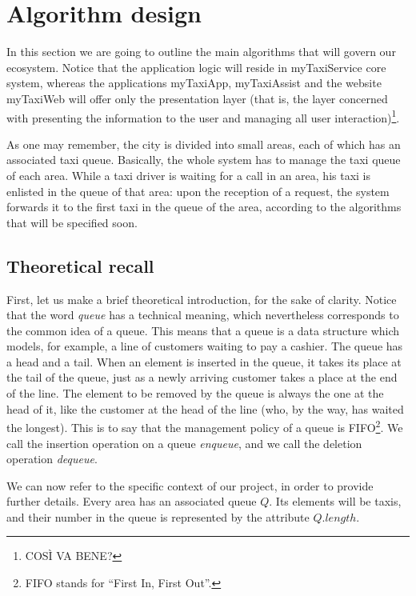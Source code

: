 \chapter{Algorithm design} \label{chap:algorithm}
In this section we are going to outline the main algorithms that will govern our ecosystem. Notice that the application logic will reside in myTaxiService core system, whereas the applications myTaxiApp, myTaxiAssist and the website myTaxiWeb will offer only the presentation layer (that is, the layer concerned with presenting the information to the user and managing all user interaction)\footnote{COS\`I VA BENE?}. %

As one may remember, the city is divided into small areas, each of which has an associated taxi queue. Basically, the whole system has to manage the taxi queue of each area. While a taxi driver is waiting for a call in an area, his taxi is enlisted in the queue of that area: upon the reception of a request, the system forwards it to the first taxi in the queue of the area, according to the algorithms that will be specified soon.


\section{Theoretical recall}
First, let us make a brief theoretical introduction, for the sake of clarity. Notice that the word \emph{queue} has a technical meaning, which nevertheless corresponds to the common idea of a queue. This means that a queue is a data structure which models, for example, a line of customers waiting to pay a cashier. The queue has a head and a tail. When an element is inserted in the queue, it takes its place at the tail of the queue, just as a newly arriving customer takes a place at the end of the line. The element to be removed by the queue is always the one at the head of it, like the customer at the head of the line (who, by the way, has waited the longest). This is to say that the management policy of a queue is FIFO\footnote{FIFO stands for ``First In, First Out''.}. We call the insertion operation on a queue \emph{enqueue}, and we call the deletion operation \emph{dequeue}.

We can now refer to the specific context of our project, in order to provide further details. Every area has an associated queue $Q$. Its elements will be taxis, and their number in the queue is represented by the attribute $Q.length$.

\newpage%


